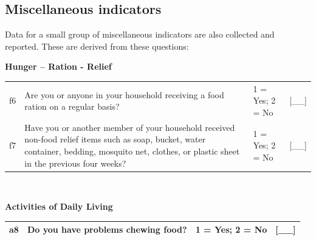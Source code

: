 \documentclass[12pt,a4paper]{book}
\begin{document}
\hypertarget{miscellaneous-indicators}{%
\subsection{Miscellaneous indicators}\label{miscellaneous-indicators}}

Data for a small group of miscellaneous indicators are also collected and reported. These are derived from these questions:

\textbf{Hunger -- Ration - Relief}

\begin{longtable}[]{@{}llll@{}}
\toprule
\endhead
\begin{minipage}[t]{0.09\columnwidth}\raggedright
f6\strut
\end{minipage} & \begin{minipage}[t]{0.41\columnwidth}\raggedright
Are you or anyone in your household receiving a
food ration on a regular basis?\strut
\end{minipage} & \begin{minipage}[t]{0.25\columnwidth}\raggedright
1 = Yes; 2 = No\strut
\end{minipage} & \begin{minipage}[t]{0.13\columnwidth}\raggedright
{[}\_\_{]}\strut
\end{minipage}\tabularnewline
\begin{minipage}[t]{0.09\columnwidth}\raggedright
f7\strut
\end{minipage} & \begin{minipage}[t]{0.41\columnwidth}\raggedright
Have you or another member of your household
received non-food relief items such as soap,
bucket, water container, bedding, mosquito net,
clothes, or plastic sheet in the previous four
weeks?\strut
\end{minipage} & \begin{minipage}[t]{0.25\columnwidth}\raggedright
1 = Yes; 2 = No\strut
\end{minipage} & \begin{minipage}[t]{0.13\columnwidth}\raggedright
{[}\_\_{]}\strut
\end{minipage}\tabularnewline
\bottomrule
\end{longtable}

~

\textbf{Activities of Daily Living}

\begin{longtable}[]{@{}llll@{}}
\toprule
\endhead
\begin{minipage}[t]{0.09\columnwidth}\raggedright
a8\strut
\end{minipage} & \begin{minipage}[t]{0.41\columnwidth}\raggedright
Do you have problems chewing food?\strut
\end{minipage} & \begin{minipage}[t]{0.25\columnwidth}\raggedright
1 = Yes; 2 = No\strut
\end{minipage} & \begin{minipage}[t]{0.13\columnwidth}\raggedright
{[}\_\_{]}\strut
\end{minipage}\tabularnewline
\bottomrule
\end{longtable}
\end{document}
